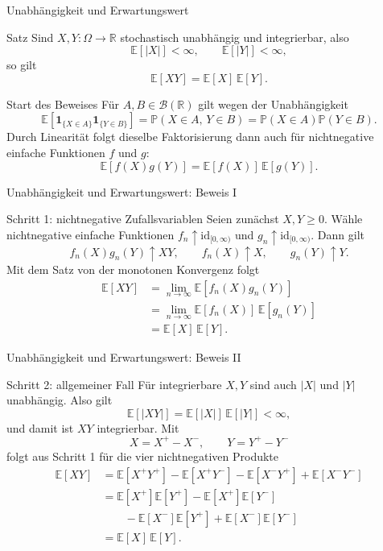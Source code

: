 \documentclass{beamer}
\begin{document}
\begin{frame}{Unabhängigkeit und Erwartungswert}
\begin{block}{Satz}
Sind \(X,Y\colon\Omega\to\mathbb R\) stochastisch unabhängig und integrierbar, also
\[
\mathbb E[|X|]<\infty,
\qquad
\mathbb E[|Y|]<\infty,
\]
so gilt
\[
\mathbb E[XY]=\mathbb E[X]\,\mathbb E[Y].
\]
\end{block}

\begin{block}{Start des Beweises}
Für \(A,B\in\mathcal B(\mathbb R)\) gilt wegen der Unabhängigkeit
\[
\mathbb E[\mathbf 1_{\{X\in A\}}\mathbf 1_{\{Y\in B\}}]
=
\mathbb P(X\in A,\,Y\in B)
=
\mathbb P(X\in A)\mathbb P(Y\in B).
\]
Durch Linearität folgt dieselbe Faktorisierung dann auch für
nichtnegative einfache Funktionen \(f\) und \(g\):
\[
\mathbb E[f(X)g(Y)]=\mathbb E[f(X)]\,\mathbb E[g(Y)].
\]
\end{block}
\end{frame}

\begin{frame}{Unabhängigkeit und Erwartungswert: Beweis I}
\begin{block}{Schritt 1: nichtnegative Zufallsvariablen}
Seien zunächst \(X,Y\ge 0\). Wähle nichtnegative einfache Funktionen
\(f_n\uparrow \mathrm{id}_{[0,\infty)}\) und \(g_n\uparrow \mathrm{id}_{[0,\infty)}\).
Dann gilt
\[
f_n(X)g_n(Y)\uparrow XY,
\qquad
f_n(X)\uparrow X,
\qquad
g_n(Y)\uparrow Y.
\]
Mit dem Satz von der monotonen Konvergenz folgt
\begin{align*}
\mathbb E[XY]
&=\lim_{n\to\infty}\mathbb E[f_n(X)g_n(Y)]\\
&=\lim_{n\to\infty}\mathbb E[f_n(X)]\,\mathbb E[g_n(Y)]\\
&=\mathbb E[X]\,\mathbb E[Y].
\end{align*}
\end{block}
\end{frame}

\begin{frame}{Unabhängigkeit und Erwartungswert: Beweis II}
\begin{block}{Schritt 2: allgemeiner Fall}
Für integrierbare \(X,Y\) sind auch \(|X|\) und \(|Y|\) unabhängig. Also gilt
\[
\mathbb E[|XY|]=\mathbb E[|X|]\,\mathbb E[|Y|]<\infty,
\]
und damit ist \(XY\) integrierbar. Mit
\[
X=X^+-X^-,
\qquad
Y=Y^+-Y^-
\]
folgt aus Schritt 1 für die vier nichtnegativen Produkte
\begin{align*}
\mathbb E[XY]
&=\mathbb E[X^+Y^+]-\mathbb E[X^+Y^-]-\mathbb E[X^-Y^+]+\mathbb E[X^-Y^-]\\
&=\mathbb E[X^+]\mathbb E[Y^+]-\mathbb E[X^+]\mathbb E[Y^-]\\
&\qquad -\mathbb E[X^-]\mathbb E[Y^+]+\mathbb E[X^-]\mathbb E[Y^-]\\
&=\mathbb E[X]\,\mathbb E[Y].
\end{align*}
\end{block}
\end{frame}
\end{document}
